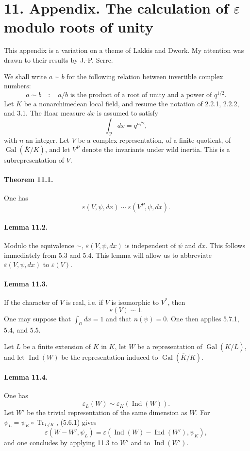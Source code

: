 \documentclass[10pt,letterpaper]{article}
\newcommand{\Gal}{\operatorname{Gal}}
\newcommand{\Ind}{\operatorname{Ind}}
\newcommand{\Tr}{\operatorname{Tr}}
\providecommand{\OO}{\mathcal O}
\providecommand{\OO}{\mathcal O}
\providecommand{\OO}{\mathcal O}
\providecommand{\OO}{\mathcal O}
\providecommand{\Gal}{\operatorname{Gal}}
\providecommand{\OO}{\mathcal O}
\providecommand{\Gal}{\operatorname{Gal}}
\providecommand{\Tr}{\operatorname{Tr}}
\providecommand{\OO}{\mathcal O}
\providecommand{\Gal}{\operatorname{Gal}}
\providecommand{\Tr}{\operatorname{Tr}}
\providecommand{\OO}{\mathcal O}
\providecommand{\Gal}{\operatorname{Gal}}
\providecommand{\Tr}{\operatorname{Tr}}
\providecommand{\Ind}{\operatorname{Ind}}
\begin{document}
\section*{11. Appendix. The calculation of \(\varepsilon\) modulo roots of unity}

This appendix is a variation on a theme of Lakkis and Dwork. My attention was drawn to their results by J.-P. Serre.

We shall write \(a\sim b\) for the following relation between invertible complex numbers:
\[
a\sim b\quad:\quad a/b\text{ is the product of a root of unity and a power of }q^{1/2}.
\]
Let \(K\) be a nonarchimedean local field, and resume the notation of 2.2.1, 2.2.2, and 3.1. The Haar measure \(dx\) is assumed to satisfy
\[
\int_{\OO}dx=q^{n/2},
\]
with \(n\) an integer. Let \(V\) be a complex representation, of a finite quotient, of \(\Gal(\overline K/K)\), and let \(V^P\) denote the invariants under wild inertia. This is a subrepresentation of \(V\).

\paragraph{Theorem 11.1.} One has
\[
\varepsilon(V,\psi,dx)\sim\varepsilon(V^P,\psi,dx).
\]

\paragraph{Lemma 11.2.} Modulo the equivalence \(\sim\), \(\varepsilon(V,\psi,dx)\) is independent of \(\psi\) and \(dx\). This follows immediately from 5.3 and 5.4. This lemma will allow us to abbreviate \(\varepsilon(V,\psi,dx)\) to \(\varepsilon(V)\).

\paragraph{Lemma 11.3.} If the character of \(V\) is real, i.e. if \(V\) is isomorphic to \(V^*\), then
\[
\varepsilon(V)\sim1.
\]
One may suppose that \(\int_{\OO}dx=1\) and that \(n(\psi)=0\). One then applies 5.7.1, 5.4, and 5.5.

Let \(L\) be a finite extension of \(K\) in \(\overline K\), let \(W\) be a representation of \(\Gal(\overline K/L)\), and let \(\Ind(W)\) be the representation induced to \(\Gal(\overline K/K)\).

\paragraph{Lemma 11.4.} One has
\[
\varepsilon_L(W)\sim\varepsilon_K(\Ind(W)).
\]
Let \(W'\) be the trivial representation of the same dimension as \(W\). For \(\psi_L=\psi_K\circ\Tr_{L/K}\), (5.6.1) gives
\[
\varepsilon(W-W',\psi_L)=\varepsilon(\Ind(W)-\Ind(W'),\psi_K),
\]
and one concludes by applying 11.3 to \(W'\) and to \(\Ind(W')\).
\end{document}
